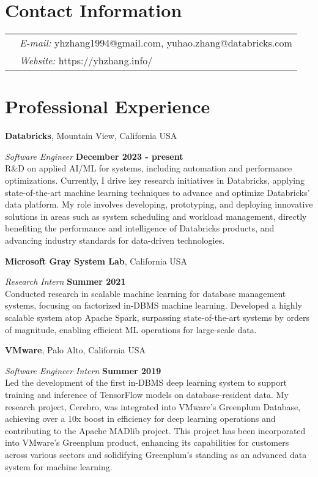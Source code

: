 \documentclass[margin,line]{res}
\begin{document}
\sloppy


\begin{resume}
\section{\sc Contact Information}
\vspace{.05in}
\begin{tabular}{@{}p{2in}p{4in}}
& {\it E-mail:} yhzhang1994@gmail.com, yuhao.zhang@databricks.com\\
& {\it Website:} https://yhzhang.info/ \\     
\end{tabular}

\section{\sc Professional Experience}
{\bf Databricks}, Mountain View, California USA

\vspace{-.3cm}
{\em Software Engineer} \hfill {\bf December 2023 - present}\\
R\&D on applied AI/ML for systems, including automation and performance optimizations. Currently, I drive key research initiatives in Databricks, applying state-of-the-art machine learning techniques to advance and optimize Databricks' data platform. My role involves developing, prototyping, and deploying innovative solutions in areas such as system scheduling and workload management, directly benefiting the performance and intelligence of Databricks products, and advancing industry standards for data-driven technologies.

{\bf Microsoft Gray System Lab}, California USA

\vspace{-.3cm}
{\em Research Intern} \hfill {\bf Summer 2021}\\
Conducted research in scalable machine learning for database management systems, focusing on factorized in-DBMS machine learning. Developed a highly scalable system atop Apache Spark, surpassing state-of-the-art systems by orders of magnitude, enabling efficient ML operations for large-scale data.

{\bf VMware}, Palo Alto, California USA

\vspace{-.3cm}
{\em Software Engineer Intern} \hfill {\bf Summer 2019}\\
Led the development of the first in-DBMS deep learning system to support training and inference of TensorFlow models on database-resident data. My research project, Cerebro, was integrated into VMware's Greenplum Database, achieving over a 10x boost in efficiency for deep learning operations and contributing to the Apache MADlib project. This project has been incorporated into VMware's Greenplum product, enhancing its capabilities for customers across various sectors and solidifying Greenplum's standing as an advanced data system for machine learning.


\end{resume}
\end{document}
